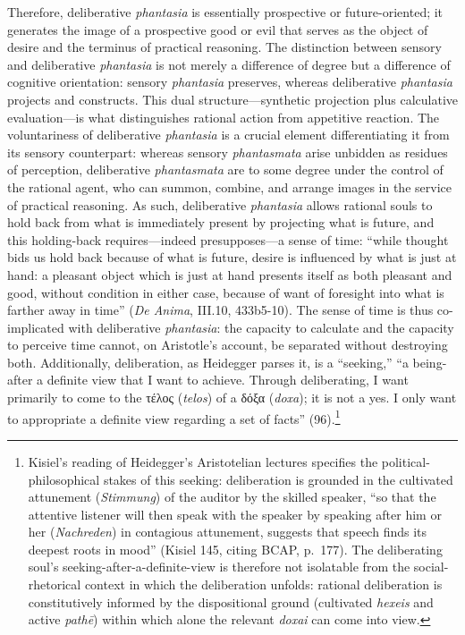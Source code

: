 \documentclass{article}
\newcommand{\gk}[1]{{\greekfont #1}}
\begin{document}
Therefore, deliberative \textit{phantasia} is essentially prospective or future-oriented; it generates the image of a prospective good or evil that serves as the object of desire and the terminus of practical reasoning. The distinction between sensory and deliberative \textit{phantasia} is not merely a difference of degree but a difference of cognitive orientation: sensory \textit{phantasia} preserves, whereas deliberative \textit{phantasia} projects and constructs. This dual structure---synthetic projection plus calculative evaluation---is what distinguishes rational action from appetitive reaction. The voluntariness of deliberative \textit{phantasia} is a crucial element differentiating it from its sensory counterpart: whereas sensory \textit{phantasmata} arise unbidden as residues of perception, deliberative \textit{phantasmata} are to some degree under the control of the rational agent, who can summon, combine, and arrange images in the service of practical reasoning. As such, deliberative \textit{phantasia} allows rational souls to hold back from what is immediately present by projecting what is future, and this holding-back requires---indeed presupposes---a sense of time: ``while thought bids us hold back because of what is future, desire is influenced by what is just at hand: a pleasant object which is just at hand presents itself as both pleasant and good, without condition in either case, because of want of foresight into what is farther away in time'' (\textit{De Anima}, III.10, 433b5-10). The sense of time is thus co-implicated with deliberative \textit{phantasia}: the capacity to calculate and the capacity to perceive time cannot, on Aristotle's account, be separated without destroying both. Additionally, deliberation, as Heidegger parses it, is a ``seeking,'' ``a being-after a definite view that I want to achieve. Through deliberating, I want primarily to come to the \gk{τέλος} (\textit{telos}) of a \gk{δόξα} (\textit{doxa}); it is not a yes. I only want to appropriate a definite view regarding a set of facts'' (96).\footnote{Kisiel's reading of Heidegger's Aristotelian lectures specifies the political-philosophical stakes of this seeking: deliberation is grounded in the cultivated attunement (\textit{Stimmung}) of the auditor by the skilled speaker, ``so that the attentive listener will then speak with the speaker by speaking after him or her (\textit{Nachreden}) in contagious attunement, suggests that speech finds its deepest roots in mood'' (Kisiel 145, citing BCAP, p.~177). The deliberating soul's seeking-after-a-definite-view is therefore not isolatable from the social-rhetorical context in which the deliberation unfolds: rational deliberation is constitutively informed by the dispositional ground (cultivated \textit{hexeis} and active \textit{pathē}) within which alone the relevant \textit{doxai} can come into view.}
\end{document}
